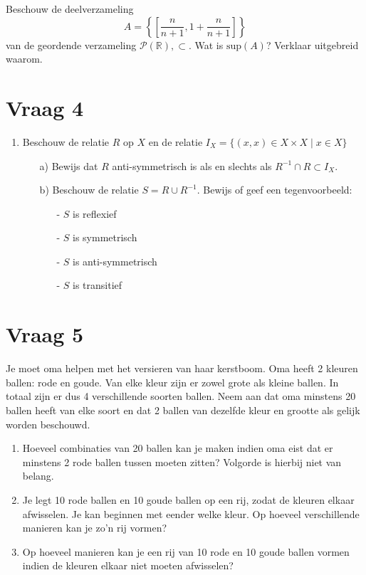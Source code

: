 \documentclass[kulak]{kulakarticle} %
\begin{document}
	Beschouw de deelverzameling \[ A = \left\{ \left[\frac{n}{n+1},1+\frac{n}{n+1} \right] \right\} \] van de geordende verzameling \(\mathcal{P}(\mathbb{R}), \subset\). Wat is \(\text{sup}(A)\)? Verklaar uitgebreid waarom.

	\section*{Vraag 4}

	\begin{enumerate}
		\item Beschouw de relatie \(R\) op \(X\) en de relatie \(I_X= \{ (x,x)\in X\times X \mid x \in X \} \)
		\begin{enumerate}
			\item[a)] Bewijs dat \(R\) anti-symmetrisch is als en slechts als \(R^{-1}\cap R \subset I_X\).
			\item[b)] Beschouw de relatie \(S=R\cup R^{-1}\). Bewijs of geef een tegenvoorbeeld:
			\begin{enumerate}
				\item[-] \(S\) is reflexief
				\item[-] \(S\) is symmetrisch
				\item[-] \(S\) is anti-symmetrisch
				\item[-] \(S\) is transitief
			\end{enumerate}
		\end{enumerate}
	\end{enumerate}

	\newpage

	\section*{Vraag 5}

	Je moet oma helpen met het versieren van haar kerstboom. Oma heeft 2 kleuren ballen: rode en goude. Van elke kleur zijn er zowel grote als kleine ballen. In totaal zijn er dus 4 verschillende soorten ballen. Neem aan dat oma minstens 20 ballen heeft van elke soort en dat 2 ballen van dezelfde kleur en grootte als gelijk worden beschouwd.

	\begin{enumerate}
		\item Hoeveel combinaties van 20 ballen kan je maken indien oma eist dat er minstens 2 rode ballen tussen moeten zitten? Volgorde is hierbij niet van belang.
		\item Je legt 10 rode ballen en 10 goude ballen op een rij, zodat de kleuren elkaar afwisselen. Je kan beginnen met eender welke kleur. Op hoeveel verschillende manieren kan je zo'n rij vormen?
		\item Op hoeveel manieren kan je een rij van 10 rode en 10 goude ballen vormen indien de kleuren elkaar niet moeten afwisselen?
	\end{enumerate}
\end{document}
